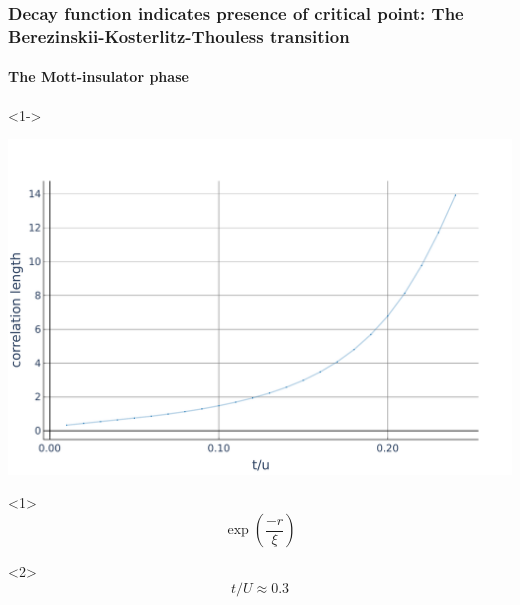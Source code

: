 \documentclass[aspectratio=169]{beamer}
\begin{document}
\begin{frame}
  \frametitle{Decay function indicates presence of critical point: The Berezinskii-Kosterlitz-Thouless transition}
  \framesubtitle{The Mott-insulator phase}
  \begin{onlyenv}<1->
    \begin{center}
      \includegraphics[scale=0.22]{../img/Correlations-length-values.pdf}
    \end{center}
  \end{onlyenv}
  \begin{onlyenv}<1>
    \begin{equation}
      \exp(\frac{-r}{\xi})
    \end{equation}
  \end{onlyenv}
  \begin{onlyenv}<2>
    \begin{equation}
      t/U \approx 0.3
    \end{equation}
  \end{onlyenv}
\end{frame}
\end{document}
